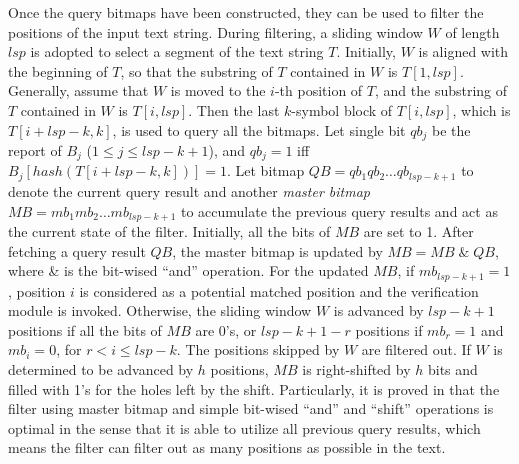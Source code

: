 \documentclass{article}
\begin{document}
Once the query bitmaps have been constructed, they can be used to
filter the positions of the input text string. During filtering, a
sliding window $W$ of length $lsp$ is adopted to select a segment of
the text string $T$. Initially, $W$ is aligned with the beginning of
$T$, so that the substring of $T$ contained in $W$ is $T[1,lsp]$.
Generally, assume that $W$ is moved to the $i$-th position of $T$, and
the substring of $T$ contained in $W$ is $T[i,lsp]$. Then the last
$k$-symbol block of $T[i,lsp]$, which is $T[i+lsp-k, k]$, is used to
query all the bitmaps. Let single bit $qb_j$ be the report of $B_j$
($1 \leq j \leq lsp - k + 1$), and $qb_j=1$ iff
$B_j[hash(T[i+lsp-k,k])] = 1$. Let bitmap
$QB = qb_1qb_2 \dots qb_{lsp-k+1}$ to denote the current query result
and another \emph{master bitmap} $MB = mb_1mb_2 \dots mb_{lsp-k+1}$ to
accumulate the previous query results and act as the current state of
the filter. Initially, all the bits of $MB$ are set to 1. After
fetching a query result $QB$, the master bitmap is updated by
$MB = MB \; \& \; QB$, where \& is the bit-wised ``and''
operation. For the updated $MB$, if $mb_{lsp-k+1} = 1$, position $i$
is considered as a potential matched position and the verification
module is invoked. Otherwise, the sliding window $W$ is advanced by
$lsp-k+1$ positions if all the bits of $MB$ are 0's, or $lsp-k+1-r$
positions if $mb_r=1$ and $mb_i=0$, for $r < i \leq lsp-k$. The
positions skipped by $W$ are filtered out. If $W$ is determined to be
advanced by $h$ positions, $MB$ is right-shifted by $h$ bits and
filled with 1's for the holes left by the shift. Particularly, it is
proved in \cite{Lee2013} that the filter using master bitmap and
simple bit-wised ``and'' and ``shift'' operations is optimal in the
sense that it is able to utilize all previous query results, which
means the filter can filter out as many positions as possible in the
text.

\end{document}

